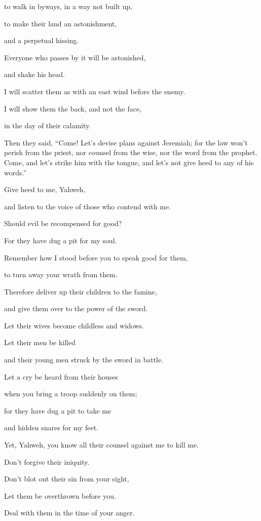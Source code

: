 {\par }{\QB to walk in byways, in a way not built up,
\par }{\Q {}to make their land an astonishment,
\par }{\QB and a perpetual hissing.
\par }{\Q Everyone who passes by it will be astonished,
\par }{\QB and shake his head.
\par }{\Q {}I will scatter them as with an east wind before the enemy.
\par }{\QB I will show them the back, and not the face,
\par }{\QB in the day of their calamity.
\par }{\PP {}Then they said, “Come! Let’s devise plans against Jeremiah; for the law won’t perish from the priest, nor counsel from the wise, nor the word from the prophet. Come, and let’s strike him with the tongue, and let’s not give heed to any of his words.”
\par }{\Q {}Give heed to me, Yahweh,
\par }{\QB and listen to the voice of those who contend with me.
\par }{\Q {}Should evil be recompensed for good?
\par }{\QB For they have dug a pit for my soul.
\par }{\Q Remember how I stood before you to speak good for them,
\par }{\QB to turn away your wrath from them.
\par }{\Q {}Therefore deliver up their children to the famine,
\par }{\QB and give them over to the power of the sword.
\par }{\Q Let their wives become childless and widows.
\par }{\QB Let their men be killed
\par }{\QB and their young men struck by the sword in battle.
\par }{\Q {}Let a cry be heard from their houses
\par }{\QB when you bring a troop suddenly on them;
\par }{\Q for they have dug a pit to take me
\par }{\QB and hidden snares for my feet.
\par }{\Q {}Yet, Yahweh, you know all their counsel against me to kill me.
\par }{\QB Don’t forgive their iniquity.
\par }{\QB Don’t blot out their sin from your sight,
\par }{\Q Let them be overthrown before you.
\par }{\QB Deal with them in the time of your anger.

}
